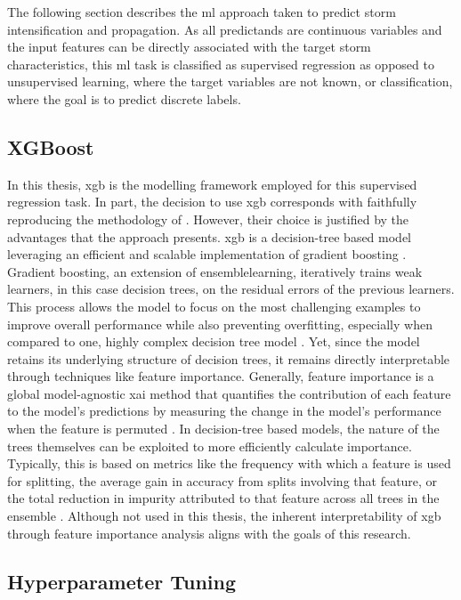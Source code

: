 The following section describes the \acrshort{ml} approach taken to predict storm intensification and propagation. As all predictands are continuous variables and the input features can be directly associated with the target storm characteristics, this \acrshort{ml} task is classified as supervised regression as opposed to unsupervised learning, where the target variables are not known, or classification, where the goal is to predict discrete labels.

\subsection{XGBoost}

In this thesis, \acrfull{xgb} is the modelling framework employed for this supervised regression task. In part, the decision to use \acrshort{xgb} corresponds with faithfully reproducing the methodology of \cite{Hunt2024}. However, their choice is justified by the advantages that the approach presents. \acrshort{xgb} is a decision-tree based model leveraging an efficient and scalable implementation of gradient boosting \citep{Chen2016}. Gradient boosting, an extension of \gls{ensemblelearning}, iteratively trains weak learners, in this case decision trees, on the residual errors of the previous learners. This process allows the model to focus on the most challenging examples to improve overall performance while also preventing overfitting, especially when compared to one, highly complex decision tree model \citep{Friedman2001}. Yet, since the model retains its underlying structure of decision trees, it remains directly interpretable through techniques like feature importance. Generally, feature importance is a global model-agnostic \acrshort{xai} method that quantifies the contribution of each feature to the model's predictions by measuring the change in the model's performance when the feature is permuted \citep{Musolf2022}. In decision-tree based models, the nature of the trees themselves can be exploited to more efficiently calculate importance. Typically, this is based on metrics like the frequency with which a feature is used for splitting, the average gain in accuracy from splits involving that feature, or the total reduction in impurity attributed to that feature across all trees in the ensemble \citep{Louppe2013}. Although not used in this thesis, the inherent interpretability of \acrshort{xgb} through feature importance analysis aligns with the goals of this research.

\subsection{Hyperparameter Tuning}

